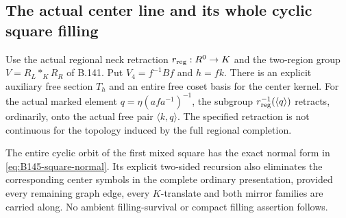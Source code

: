 \subsection*{The actual center line and its whole cyclic square filling}

\label{stmt:B145}
Use the actual regional neck retraction $r_{\rm reg}:R^0\to K$
and the two-region group $V=R_L*_KR_R$ of B.141. Put
$V_4=f^{-1}Bf$ and $h=fk$. There is an explicit auxiliary free
section $T_h$ and an entire free coset basis for the center kernel.
For the actual marked element $q=\eta(afa^{-1})^{-1}$, the subgroup
$r_{\rm reg}^{-1}(\langle q\rangle)$ retracts, ordinarily, onto the
actual free pair $\langle k,q\rangle$. The specified retraction
is not continuous for the topology induced by the full regional
completion.

The entire cyclic orbit of the first mixed square has the exact
normal form in \eqref{eq:B145-square-normal}. Its explicit two-sided
recursion also eliminates the corresponding center symbols in the
complete ordinary presentation, provided every remaining graph edge,
every $K$-translate and both mirror families are carried along.
No ambient filling-survival or compact filling assertion follows.

